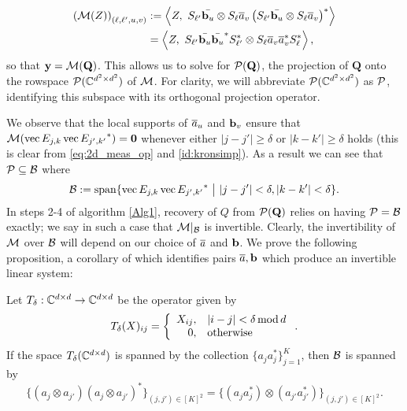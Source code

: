 \begin{equation}
  \begin{aligned}
\left(\mathcal{M}(Z) \right)_{(\ell,\ell',u,v)} &:= \left\langle  Z, ~S_{\ell'} \bar{\b_u} \otimes S_{\ell} \a_v \left(S_{\ell'} \bar{\b_u} \otimes S_{\ell} \a_v\right)^*\right\rangle \\ &= \left\langle Z, ~S_{\ell'} \bar{\b_u}\bar{\b_u}^* S^*_{\ell'} \otimes S_\ell \a_v \a_v^* S^*_\ell \right\rangle,
  \end{aligned}
  \label{eq:2d_meas_op}
\end{equation}
so that $\y = \mathcal{M}(\mathbf{Q})$.  This allows us to solve for $\Pc(\mathbf{Q})$, the projection of $\mathbf{Q}$ onto the rowspace $\Pc(\C^{d^2 \times d^2})$ of $\Mc$.  For clarity, we will abbreviate $\Pc(\C^{d^2 \times d^2})$ as $\Pc$, identifying this subspace with its orthogonal projection operator.

We observe that the local supports of $\a_u$ and $\b_v$ ensure that $\mathcal{M}( \vec{E_{j,k}} \vec{E_{j',k'}}^*) = {\bf 0}$ whenever either $|j - j'| \geq \delta$ or $|k - k'| \geq \delta$ holds (this is clear from \eqref{eq:2d_meas_op} and \eqref{id:kronsimp}).  As a result we can see that $\Pc \subset \B$ where \begin{equation} \B := \Span\{ \vec{E_{j,k}} \vec{E_{j',k'}}^* ~{\bf \big |}~  |j - j'| < \delta, |k - k'| < \delta \}. \label{eq:defB} \end{equation}  %
In steps 2-4 of algorithm \ref{Alg1}, recovery of $Q$ from $\Pc(\mathbf{Q})$ relies on having $\Pc = \B$ exactly; we say in such a case that $\Mc|_\B$ is invertible.  Clearly, the invertibility of $\Mc$ over $\B$ will depend on our choice of $\a$ and $\b$.  We prove the following proposition, a corollary of which identifies pairs $\a, \b$ which produce an invertible linear system:
\begin{proposition}
  Let $T_\delta : \C^{d \times d} \to \C^{d \times d}$ be the operator given by \[T_\delta(X)_{ij} = \left\{\begin{array}{r@{,\quad}l}
  X_{ij} & |i - j| < \delta \mod d \\
  0 & \text{otherwise}\end{array}\right..\]
  If the space $T_{\delta}(\C^{d \times d})$ is spanned by the collection $\{a_j a_j^*\}_{j=1}^K$, then $\B$ is spanned by \[\{(a_j \otimes a_{j'}) (a_j \otimes a_{j'})^*\}_{(j, j') \in [K]^2} = \{(a_j a_j^*) \otimes (a_{j'} a_{j'}^*)\}_{(j, j') \in [K]^2}.\]
  \label{prop:kronspan}
\end{proposition}

